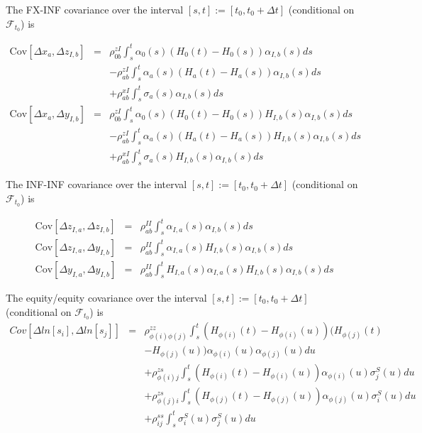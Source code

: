\documentclass[12pt, a4paper]{article}
\begin{document}
{\begin{appendix}
The FX-INF covariance over the interval $[s,t] := [t_0, t_0+\Delta t]$ (conditional on $\mathcal{F}_{t_0}$) is

\begin{eqnarray*}
  \mathrm{Cov}[ \Delta x_a, \Delta z_{I,b} ] & = & \rho_{0b}^{zI} \int_s^t \alpha_0(s) (H_0(t)-H_0(s)) \alpha_{I,b}(s) ds \\
                                             & & -\rho_{ab}^{zI} \int_s^t \alpha_a(s)(H_a(t)-H_a(s))\alpha_{I,b}(s) ds \\
                                             & & +\rho_{ab}^{xI}\int_s^t \sigma_a(s) \alpha_{I,b}(s) ds \\
  \mathrm{Cov}[ \Delta x_a, \Delta y_{I,b} ] & = & \rho_{0b}^{zI} \int_s^t \alpha_0(s) (H_0(t)-H_0(s)) H_{I,b}(s)\alpha_{I,b}(s) ds \\
                                             & & -\rho_{ab}^{zI} \int_s^t \alpha_a(s)(H_a(t)-H_a(s))H_{I,b}(s)\alpha_{I,b}(s) ds \\
                                             & & +\rho_{ab}^{xI}\int_s^t \sigma_a(s) H_{I,b}(s)\alpha_{I,b}(s) ds
\end{eqnarray*}

The INF-INF covariance over the interval $[s,t] := [t_0, t_0+\Delta t]$ (conditional on $\mathcal{F}_{t_0}$) is

\begin{eqnarray*}
  \mathrm{Cov}[ \Delta z_{I,a}, \Delta z_{I,b} ] & = & \rho_{ab}^{II} \int_s^t \alpha_{I,a}(s) \alpha_{I,b}(s) ds \\
  \mathrm{Cov}[ \Delta z_{I,a}, \Delta y_{I,b} ] & = & \rho_{ab}^{II} \int_s^t \alpha_{I,a}(s) H_{I,b}(s)
                                                       \alpha_{I,b}(s) ds \\
  \mathrm{Cov}[ \Delta y_{I,a}, \Delta y_{I,b} ] & = & \rho_{ab}^{II} \int_s^t H_{I,a}(s) \alpha_{I,a}(s) H_{I,b}(s) \alpha_{I,b}(s) ds
\end{eqnarray*}

The equity/equity covariance over the interval $[s,t] := [t_0, t_0+\Delta t]$ (conditional on $\mathcal{F}_{t_0}$) is
\begin{eqnarray*}
	Cov \left[\Delta ln[s_i], \Delta ln[s_j] \right] &=&
	\rho_{\phi(i) \phi(j)}^{zz}\int_s^t (H_{\phi(i)} (t) - H_{\phi(i)} (u)) (H_{\phi(j)} (t)\\
	&& - H_{\phi(j)} (u)) \alpha_{\phi(i)}(u) \alpha_{\phi(j)}(u) du\\
	&&+ \rho_{\phi(i) j}^{zs} \int_s^t (H_{\phi(i)} (t) - H_{\phi(i)} (u)) \alpha_{\phi(i)}(u) \sigma_j^S(u) du\\
	&&+ \rho_{\phi(j) i}^{zs} \int_s^t (H_{\phi(j)} (t) - H_{\phi(j)} (u)) \alpha_{\phi(j)}(u) \sigma_i^S(u) du\\
	&&+ \rho_{ij}^{ss} \int_s^t \sigma_i^S(u) \sigma_j^S(u) du\\
\end{eqnarray*}


\end{appendix}}
\end{document}
